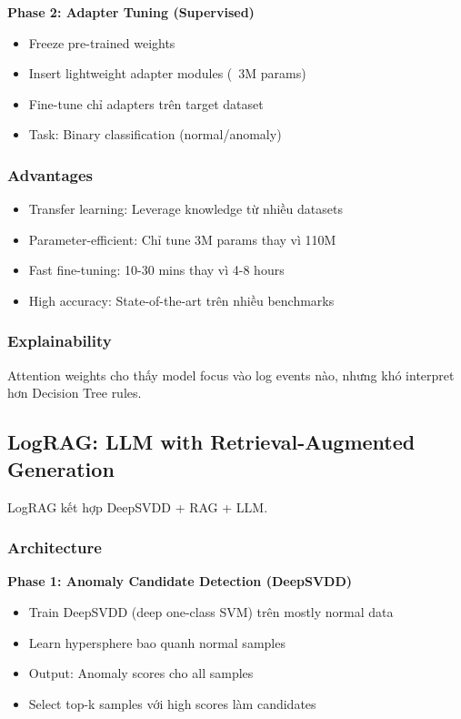 \textbf{Phase 2: Adapter Tuning (Supervised)}
\begin{itemize}
    \item Freeze pre-trained weights
    \item Insert lightweight adapter modules (~3M params)
    \item Fine-tune chỉ adapters trên target dataset
    \item Task: Binary classification (normal/anomaly)
\end{itemize}

\subsubsection{Advantages}

\begin{itemize}
    \item Transfer learning: Leverage knowledge từ nhiều datasets
    \item Parameter-efficient: Chỉ tune 3M params thay vì 110M
    \item Fast fine-tuning: 10-30 mins thay vì 4-8 hours
    \item High accuracy: State-of-the-art trên nhiều benchmarks
\end{itemize}

\subsubsection{Explainability}

Attention weights cho thấy model focus vào log events nào, nhưng khó interpret hơn Decision Tree rules.

\subsection{LogRAG: LLM with Retrieval-Augmented Generation}

LogRAG \cite{jiang2024lograg} kết hợp DeepSVDD + RAG + LLM.

\subsubsection{Architecture}

\textbf{Phase 1: Anomaly Candidate Detection (DeepSVDD)}
\begin{itemize}
    \item Train DeepSVDD (deep one-class SVM) trên mostly normal data
    \item Learn hypersphere bao quanh normal samples
    \item Output: Anomaly scores cho all samples
    \item Select top-k samples với high scores làm candidates
\end{itemize}

